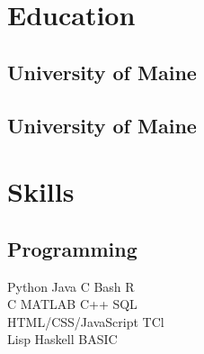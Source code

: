 \documentclass[letterpaper]{AMcEnaneyResume} %
\begin{document}
\begin{minipage}[t]{0.33\textwidth} %


\section{Education} 

    \subsection{University of Maine}

    \sectionspace

    \subsection{University of Maine}


    \sectionspace %


\section{Skills}

    \subsection{Programming}

        \textbullet{} Python \textbullet{} Java \textbullet{} C \textbullet{} Bash \textbullet{} R \\
        \textbullet{} C \textbullet{} MATLAB \textbullet{} C++ \textbullet{} SQL \\ 
        \textbullet{} HTML/CSS/JavaScript \textbullet{} TCl \\
        \textbullet{} Lisp \textbullet{} Haskell \textbullet{} BASIC
        

\end{minipage}
\end{document}
